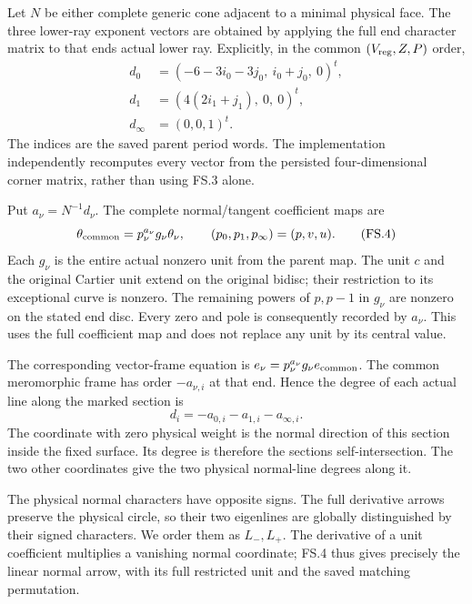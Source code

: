 \par\nobreak

Let \(N\) be either complete generic cone
adjacent to a minimal physical face. The
three lower-ray exponent vectors are obtained
by applying the full end character matrix
to that end\textquotesingle s actual lower ray. Explicitly,
in the common \((V_{\rm reg},Z,P)\) order,
\[
 \begin{aligned}
 d_0&=(-6-3i_0-3j_0,\ i_0+j_0,\ 0)^t,\\
 d_1&=(4(2i_1+j_1),\ 0,\ 0)^t,\\
 d_\infty&=(0,0,1)^t .
 \end{aligned}                                               \tag{FS.3}
\]
The indices are the saved parent period words.
The implementation independently recomputes
every vector from the persisted four-dimensional
corner matrix, rather than using FS.3 alone.

Put \(a_\nu=N^{-1}d_\nu\). The complete
normal/tangent coefficient maps are
\[
 \theta_{\rm common}
       =p_\nu^{a_\nu}g_\nu\theta_\nu,\qquad
 (p_0,p_1,p_\infty)=(p,v,u).                               \tag{FS.4}
\]
Each \(g_\nu\) is the entire actual nonzero
unit from the parent map. The unit \(c\) and
the original Cartier unit extend on the
original bidisc; their restriction to its
exceptional curve is nonzero. The remaining
powers of \(p,p-1\) in \(g_\nu\) are nonzero
on the stated end disc. Every zero and pole
is consequently recorded by \(a_\nu\).
This uses the full coefficient map and does
not replace any unit by its central value.

The corresponding vector-frame equation is
\(e_\nu=p_\nu^{a_\nu}g_\nu e_{\rm common}\).
The common meromorphic frame has order
\(-a_{\nu,i}\) at that end. Hence the degree
of each actual line along the marked
section is
\[
 d_i=-a_{0,i}-a_{1,i}-a_{\infty,i}.                        \tag{FS.5}
\]
The coordinate with zero physical weight
is the normal direction of this section
inside the fixed surface. Its degree is
therefore the section\textquotesingle s self-intersection.
The two other coordinates give the two
physical normal-line degrees along it.

The physical normal characters have opposite
signs. The full derivative arrows preserve
the physical circle, so their two eigenlines
are globally distinguished by their signed
characters. We order them as \(L_-,L_+\).
The derivative of a unit coefficient
multiplies a vanishing normal coordinate;
FS.4 thus gives precisely the linear
normal arrow, with its full restricted
unit and the saved matching permutation.

